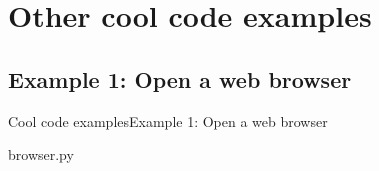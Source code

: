 \documentclass[10pt,compress]{beamer} %
\begin{document}
\section{Other cool code examples}

\subsection{Example 1: Open a web browser}
\begin{frame}{Cool code examples}{Example 1: Open a web browser}
	\vspace{-0.2cm}
	\begin{block}{browser.py}
	\vspace{-0.2cm}
	
	\vspace{-0.2cm}
	\end{block}
\end{frame}
\end{document}
